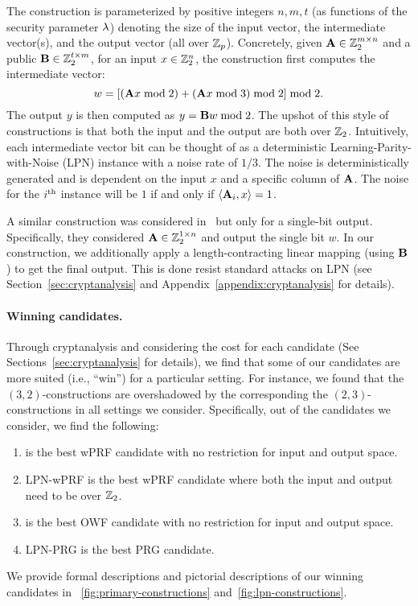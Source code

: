 \begin{itemize}
    \hspace*{1em} The construction is parameterized by positive integers $n,m,t$ (as functions of the security parameter $\lambda$) denoting the size of the input vector, the intermediate vector(s), and the output vector (all over $\mathbb{Z}_p$).
    Concretely, given $\mat{A} \in \Z_2^{m \times n}$ and a public $\mat{B} \in \Z_2^{t \times m}$, for an input $x \in \mathbb{Z}_2^n$, the construction first computes the intermediate vector:
    \[
        w = \left[(\mat{A}x \bmod 2) + (\mat{A}x \bmod 3) \bmod 2\right] \bmod 2.
    \]
    The output $y$ is then computed as $y = \mat{B}w \bmod 2$. The upshot of this style of constructions is that both the input and the output are both over $\mathbb{Z}_2$. Intuitively, each intermediate vector bit can be thought of as a deterministic Learning-Parity-with-Noise (LPN) instance with a noise rate of $1/3$. The noise is deterministically generated and is dependent on the input $x$ and a specific column of $\mat{A}$. The noise for the $i^{\textnormal{th}}$ instance will be $1$ if and only if $\left<\mat{A}_i, x\right> = 1$.

    \hspace*{1em} A similar construction was considered in~\cite{boneh2018-darkmatter} but only for a single-bit output. Specifically, they considered $\mat{A} \in \Z_2^{1 \times n}$ and output the single bit $w$. In our construction, we additionally apply a length-contracting linear mapping (using $\mat{B}$) to get the final output. This is done resist standard attacks on LPN (see Section~\ref{sec:cryptanalysis} and Appendix~\ref{appendix:cryptanalysis} for details).
\end{itemize}


\paragraph{Winning candidates.}
Through cryptanalysis and considering the cost for each candidate (See Sections~\ref{sec:cryptanalysis} for details), we find that some of our candidates are more suited (i.e., ``win'') for a particular setting. For instance, we found that the $(3,2)$-constructions are overshadowed by the corresponding the $(2,3)$-constructions in all settings we consider. Specifically, out of the candidates we consider, we find the following:
\begin{enumerate}
    \item \ttwPRF is the best wPRF candidate with no restriction for input and output space. 
    \item LPN-wPRF is the best wPRF candidate where both the input and output need to be over $\mathbb{Z}_2$.
    \item \ttOWF is the best OWF candidate with no restriction for input and output space.
    \item LPN-PRG is the best PRG candidate.
\end{enumerate}
We provide formal descriptions and pictorial descriptions of our winning candidates in \fig~\ref{fig:primary-constructions} and~\ref{fig:lpn-constructions}.

